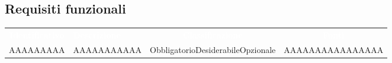 \renewcommand{\o}{Obbligatorio}
\renewcommand{\d}{Desiderabile}
\newcommand{\op}{Opzionale}
\subsection{Requisiti funzionali}
{
\renewcommand{\arraystretch}{1.5}
\centering
\begin{longtable}{ c C{4cm} c c}
\textcolor{white}{\textbf{Identificativo}} & \textcolor{white}{\textbf{Descrizione}} & \textcolor{white}{\textbf{Classificazione}} & \textcolor{white}{\textbf{Fonti}}\\	

AAAAAAAAA & AAAAAAAAAAA & \o \d \op & AAAAAAAAAAAAAAAA\\

\end{longtable}
}
